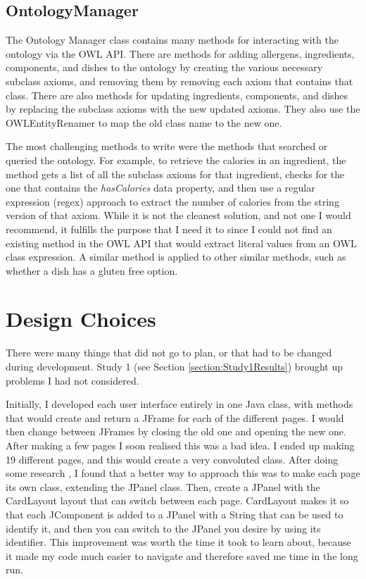 \subsection{OntologyManager}

The Ontology Manager class contains many methods for interacting with the ontology via the OWL API. There are methods for adding allergens, ingredients, components, and dishes to the ontology by creating the various necessary subclass axioms, and removing them by removing each axiom that contains that class. There are also methods for updating ingredients, components, and dishes by replacing the subclass axioms with the new updated axioms. They also use the OWLEntityRenamer \cite{owl_api_doc_2023} to map the old class name to the new one.

The most challenging methods to write were the methods that searched or queried the ontology. For example, to retrieve the calories in an ingredient, the method gets a list of all the subclass axioms for that ingredient, checks for the one that contains the \textit{hasCalories} data property, and then use a regular expression (regex) approach to extract the number of calories from the string version of that axiom. While it is not the cleanest solution, and not one I would recommend, it fulfills the purpose that I need it to since I could not find an existing method in the OWL API that would extract literal values from an OWL class expression. A similar method is applied to other similar methods, such as whether a dish has a gluten free option.

\section{Design Choices}

There were many things that did not go to plan, or that had to be changed during development. Study 1 (see Section \ref{section:Study1Results}) brought up problems I had not considered.

Initially, I developed each user interface entirely in one Java class, with methods that would create and return a JFrame for each of the different pages. I would then change between JFrames by closing the old one and opening the new one. After making a few pages I soon realised this was a bad idea. I ended up making 19 different pages, and this would create a very convoluted class. After doing some research \cite{card_layout_2011}, I found that a better way to approach this was to make each page its own class, extending the JPanel class. Then, create a JPanel with the CardLayout layout that can switch between each page. CardLayout makes it so that each JComponent is added to a JPanel with a String that can be used to identify it, and then you can switch to the JPanel you desire by using its identifier. This improvement was worth the time it took to learn about, because it made my code much easier to navigate and therefore saved me time in the long run.

